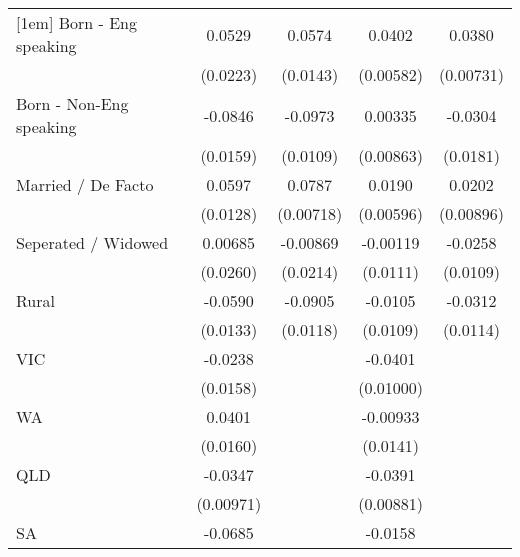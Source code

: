 {\begin{tabular}{l*{4}{c}}
[1em]
Born - Eng speaking &      0.0529\sym{*}  &      0.0574\sym{***}&      0.0402\sym{***}&      0.0380\sym{***}\\
                    &    (0.0223)         &    (0.0143)         &   (0.00582)         &   (0.00731)         \\
[1em]
Born - Non-Eng speaking&     -0.0846\sym{***}&     -0.0973\sym{***}&     0.00335         &     -0.0304         \\
                    &    (0.0159)         &    (0.0109)         &   (0.00863)         &    (0.0181)         \\
[1em]
Married / De Facto  &      0.0597\sym{***}&      0.0787\sym{***}&      0.0190\sym{**} &      0.0202\sym{*}  \\
                    &    (0.0128)         &   (0.00718)         &   (0.00596)         &   (0.00896)         \\
[1em]
Seperated / Widowed &     0.00685         &    -0.00869         &    -0.00119         &     -0.0258\sym{*}  \\
                    &    (0.0260)         &    (0.0214)         &    (0.0111)         &    (0.0109)         \\
[1em]
Rural               &     -0.0590\sym{***}&     -0.0905\sym{***}&     -0.0105         &     -0.0312\sym{**} \\
                    &    (0.0133)         &    (0.0118)         &    (0.0109)         &    (0.0114)         \\
[1em]
VIC                 &     -0.0238         &                     &     -0.0401\sym{***}&                     \\
                    &    (0.0158)         &                     &   (0.01000)         &                     \\
[1em]
WA                  &      0.0401\sym{*}  &                     &    -0.00933         &                     \\
                    &    (0.0160)         &                     &    (0.0141)         &                     \\
[1em]
QLD                 &     -0.0347\sym{***}&                     &     -0.0391\sym{***}&                     \\
                    &   (0.00971)         &                     &   (0.00881)         &                     \\
[1em]
SA                  &     -0.0685\sym{***}&                     &     -0.0158         &                     \\

\end{tabular}}
